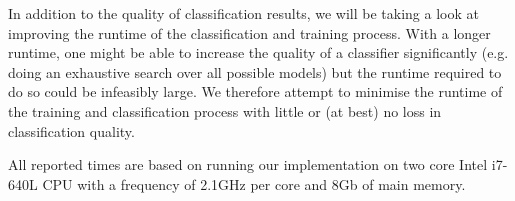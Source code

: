 In addition to the quality of classification results, we will be taking a look at improving the runtime of the classification and training process.
With a longer runtime, one might be able to increase the quality of a classifier  significantly (e.g. doing an exhaustive search over all possible models) but the runtime required to do so could be infeasibly large. We therefore attempt to minimise the runtime of the training and classification process with little or (at best) no loss in classification quality.

All reported times are based on running our implementation on two core Intel i7-640L CPU with a frequency of 2.1GHz per core and 8Gb of main memory.

